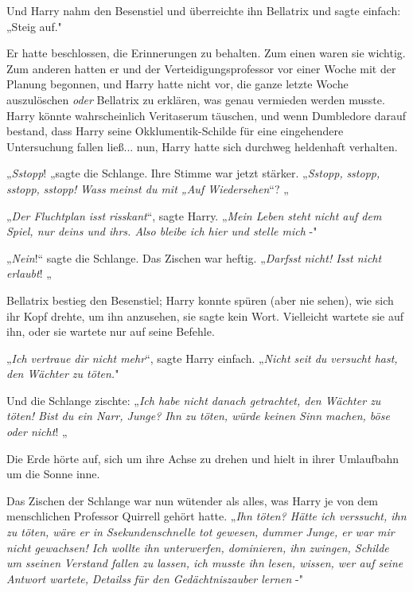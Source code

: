 {Und Harry nahm den Besenstiel und überreichte ihn Bellatrix und sagte einfach: „Steig auf."

Er hatte beschlossen, die Erinnerungen zu behalten. Zum einen waren sie wichtig. Zum anderen hatten er und der Verteidigungsprofessor vor einer Woche mit der Planung begonnen, und Harry hatte nicht vor, die ganze letzte Woche auszulöschen \emph{oder} Bellatrix zu erklären, was genau vermieden werden musste. Harry könnte wahrscheinlich Veritaserum täuschen, und wenn Dumbledore darauf bestand, dass Harry seine Okklumentik-Schilde für eine eingehendere Untersuchung fallen ließ... nun, Harry hatte sich durchweg heldenhaft verhalten.

„\emph{Sstopp}! „sagte die Schlange. Ihre Stimme war jetzt stärker. „\emph{Sstopp,} \emph{sstopp,} \emph{sstopp,} \emph{sstopp!} \emph{Wass} \emph{meinst du mit „Auf Wiedersehen}“? „

„\emph{Der Fluchtplan isst} \emph{risskant}“, sagte Harry. „\emph{Mein Leben steht nicht auf dem Spiel, nur deins und ihrs. Also bleibe ich hier und stelle mich} -"

„\emph{Nein}!“ sagte die Schlange. Das Zischen war heftig. „\emph{Darfsst} \emph{nicht! Isst nicht erlaubt}! „

Bellatrix bestieg den Besenstiel; Harry konnte spüren (aber nie sehen), wie sich ihr Kopf drehte, um ihn anzusehen, sie sagte kein Wort. Vielleicht wartete sie auf ihn, oder sie wartete nur auf seine Befehle.

„\emph{Ich vertraue dir nicht mehr}“, sagte Harry einfach. „\emph{Nicht seit du versucht hast, den Wächter zu töten.}"

Und die Schlange zischte: „\emph{Ich habe nicht danach getrachtet, den Wächter zu töten! Bist du ein Narr, Junge? Ihn zu töten, würde keinen Sinn machen, böse oder nicht}! „

Die Erde hörte auf, sich um ihre Achse zu drehen und hielt in ihrer Umlaufbahn um die Sonne inne.

Das Zischen der Schlange war nun wütender als alles, was Harry je von dem menschlichen Professor Quirrell gehört hatte. „\emph{Ihn töten? Hätte ich verssucht, ihn zu töten, wäre er in} \emph{Ssekundenschnelle} \emph{tot gewesen, dummer Junge, er war mir nicht gewachsen! Ich wollte ihn unterwerfen, dominieren, ihn zwingen, Schilde um} \emph{sseinen} \emph{Verstand fallen zu lassen, ich musste ihn lesen, wissen, wer auf seine Antwort wartete,} \emph{Detailss} \emph{für den Gedächtniszauber lernen} -"

}
